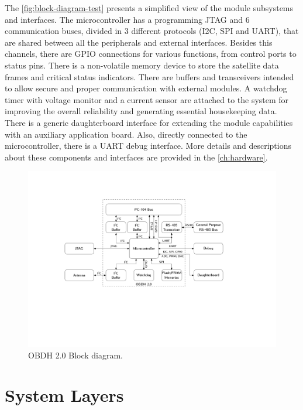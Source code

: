 The \autoref{fig:block-diagram-test} presents a simplified view of the module subsystems and interfaces. The microcontroller has a programming JTAG and 6 communication buses, divided in 3 different protocols (I2C, SPI and UART), that are shared between all the peripherals and external interfaces. Besides this channels, there are GPIO connections for various functions, from control ports to status pins. There is a non-volatile memory device to store the satellite data frames and critical status indicators. There are buffers and transceivers intended to allow secure and proper communication with external modules. A watchdog timer with voltage monitor and a current sensor are attached to the system for improving the overall reliability and generating essential housekeeping data. There is a generic daughterboard interface for extending the module capabilities with an auxiliary application board. Also, directly connected to the microcontroller, there is a UART debug interface. More details and descriptions about these components and interfaces are provided in the \autoref{ch:hardware}. 

\begin{figure}[!ht]
    \begin{center}
        \includegraphics[width=\textwidth]{figures/block_diagram.pdf}
        \caption{OBDH 2.0 Block diagram.}
        \label{fig:block-diagram-test}
    \end{center}
\end{figure}

\section{System Layers}

